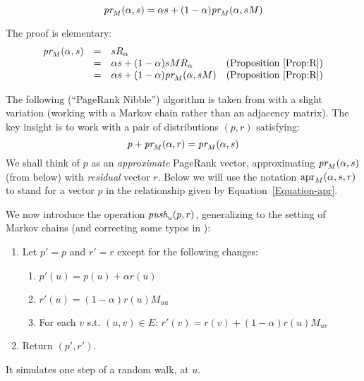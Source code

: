 \documentclass{article} %
\begin{document}
\begin{proposition}
  \begin{equation}\label{Equation-key}
     \mbox{\em pr}_M  (\alpha,s)=\alpha s + (1 -\alpha)\mbox{\em pr}_M(\alpha, sM)    
  \end{equation}
\end{proposition}
The proof is elementary:
$$
\begin{array}{llll}
 \mbox{\em pr}_M(\alpha,s) &=& sR_{\alpha} \\
&=& \alpha s + (1-\alpha)s M R_{\alpha} & \mbox{(Proposition~\ref{Prop:R})}\\
&=& \alpha s + (1-\alpha)\mbox{\em pr}_M(\alpha,s M) & \mbox{(Proposition~\ref{Prop:R})}
\end{array}
$$

The following (``PageRank Nibble'') algorithm is taken from \cite{Andersen-2006} with a slight variation (working with a Markov chain rather than an adjacency matrix). The key insight is to work with a pair of distributions $(p,r)$ satisfying:
\begin{equation}\label{Equation-apr}
  p + \mbox{\em pr}_M(\alpha,r) = \mbox{\em pr}_M(\alpha,s)
\end{equation}
We shall think of $p$ as an {\em approximate} PageRank vector, approximating $\mbox{\em pr}_M(\alpha,s)$ (from below) with {\em residual} vector $r$. Below we will use the notation $\mbox{apr}_M(\alpha,s,r)$ to stand for a vector $p$ in the relationship given by Equation~\ref{Equation-apr}. 

We now introduce the operation $\mbox{\em push}_u(p,r)$, generalizing \cite[Section 3]{Andersen-2006} to the setting of Markov chains (and correcting some typos in \cite[Table 2]{Cohen-2015}): 
\begin{enumerate}
\item Let $p'=p$ and $r'=r$ except for the following changes:
  \begin{enumerate}
  \item $p'(u)=p(u) + \alpha r(u)$
  \item $r'(u) = (1-\alpha)r(u) M_{uu}$
  \item For each $v$ s.t. $(u,v)\in E$: $r'(v)=r(v)+ (1-\alpha)r(u)M_{uv}$
  \end{enumerate}
\item Return $(p',r')$.
\end{enumerate}
\noindent It simulates one step of a random walk, at $u$. 
\end{document}
